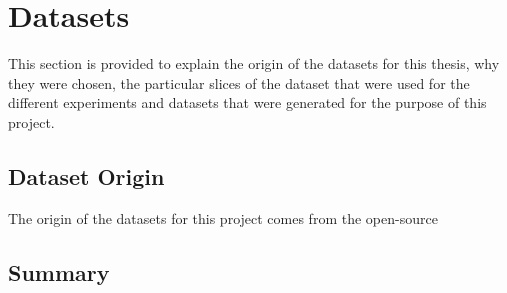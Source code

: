 \chapter{Datasets} \label{chap:datasets}

This section is provided to explain the origin of the datasets for this thesis,
why they were chosen, the particular slices of the dataset that were used for
the different experiments and datasets that were generated for the purpose of
this project.

\section{Dataset Origin}

The origin of the datasets for this project comes from the open-source 

\section{Summary}
